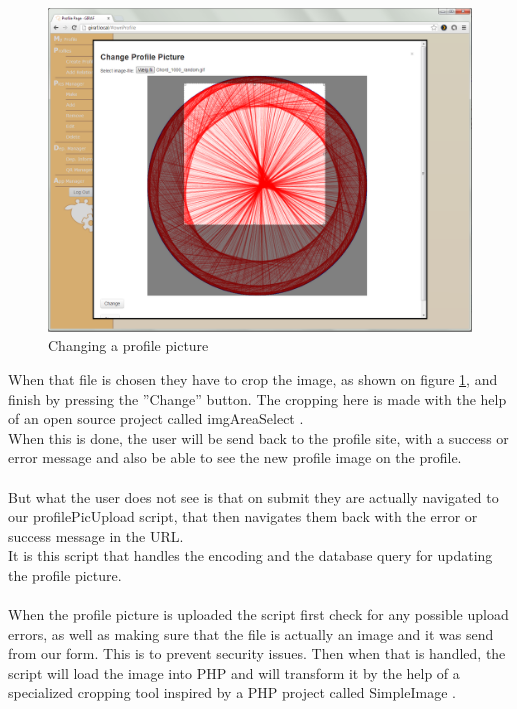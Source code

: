 \begin{figure}[htbp]
	\centering
		\includegraphics[width=1.0\textwidth]{images/profilePicChange.png}
	\caption{Changing a profile picture}
	\label{fig:profilePicChange}
\end{figure}

When that file is chosen they have to crop the image, as shown on figure \ref{fig:profilePicChange}, and finish by pressing the ''Change'' button.
The cropping here is made with the help of an open source project called imgAreaSelect \citep{imgAreaSelect}.\\
When this is done, the user will be send back to the profile site, with a success or error message and also be able to see the new profile image on the profile.\\
\\
But what the user does not see is that on submit they are actually navigated to our profilePicUpload script, that then navigates them back with the error or success message in the URL.\\
It is this script that handles the encoding and the database query for updating the profile picture.\\
\\
When the profile picture is uploaded the script first check for any possible upload errors, as well as making sure that the file is actually an image and it was send from our form. This is to prevent security issues.
Then when that is handled, the script will load the image into PHP and will transform it by the help of a specialized cropping tool inspired by a PHP project called SimpleImage \citep{simpleimage}.\\
\\

